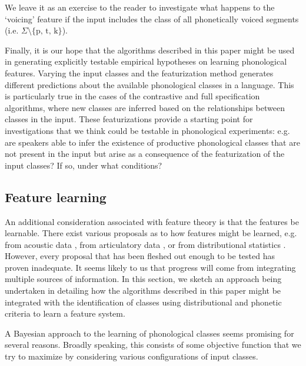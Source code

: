 \documentclass[11pt, oneside]{article}   	%
\begin{document}
We leave it as an exercise to the reader to investigate what happens to the `voicing' feature if the input includes the class of all phonetically voiced segments (i.e. $\Sigma \setminus \text{\{p, t, k\}}$).

Finally, it is our hope that the algorithms described in this paper might be used in generating explicitly testable empirical hypotheses on learning phonological features. Varying the input classes and the featurization method generates different predictions about the available phonological classes in a language. This is particularly true in the cases of the contrastive and full specification algorithms, where new classes are inferred based on the relationships between classes in the input. These featurizations provide a starting point for investigations that we think could be testable in phonological experiments: e.g. are speakers able to infer the existence of productive phonological classes that are not present in the input but arise as a consequence of the featurization of the input classes? If so, under what conditions? 

\subsection{Feature learning}

An additional consideration associated with feature theory is that the features be learnable. There exist various proposals as to how features might be learned, e.g. from acoustic data \cite{TODO}, from articulatory data \cite{TODO}, or from distributional statistics \cite{TODO}. However, every proposal that has been fleshed out enough to be tested has proven inadequate. It seems likely to us that progress will come from integrating multiple sources of information. In this section, we sketch an approach being undertaken in  detailing how the algorithms described in this paper might be integrated with the identification of classes using distributional and phonetic criteria to learn a feature system.

A Bayesian approach to the learning of phonological classes seems promising for several reasons. Broadly speaking, this consists of some objective function that we try to maximize by considering various configurations of input classes. 
\end{document}
